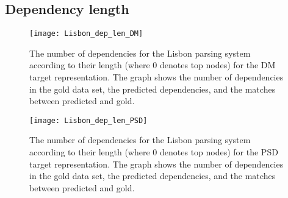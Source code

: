 


\subsection{Dependency length}

\begin{figure}[h]
    \centering
    \begin{minipage}{0.8\textwidth}
        \centering
        \texttt{[image: Lisbon\_dep\_len\_DM]}
    \end{minipage}\hfill
    \caption{The number of dependencies for the Lisbon parsing system according to their length (where 0 denotes top nodes) for the DM target representation. The graph shows the number of dependencies in the gold data set, the predicted dependencies, and the matches between predicted and gold.}
    \label{fig:Lisbon_dep_len_DM}
\end{figure}

\begin{figure}[h]
    \centering
    \begin{minipage}{0.8\textwidth}
        \centering
        \texttt{[image: Lisbon\_dep\_len\_PSD]}
    \end{minipage}
    \caption{The number of dependencies for the Lisbon parsing system according to their length (where 0 denotes top nodes) for the PSD target representation. The graph shows the number of dependencies in the gold data set, the predicted dependencies, and the matches between predicted and gold.}
    \label{fig:Lisbon_dep_len_DM}
\end{figure}

